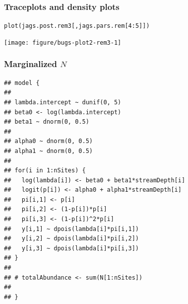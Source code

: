 \documentclass[color=usenames,dvipsnames]{beamer}\usepackage[]{graphicx}\usepackage[]{color}
\makeatletter
\newcommand{\hlnum}[1]{\textcolor[rgb]{0.69,0.494,0}{#1}}%
\newcommand{\hlopt}[1]{\textcolor[rgb]{0,0,0}{#1}}%
\newcommand{\hlstd}[1]{\textcolor[rgb]{0,0,0}{#1}}%
\newcommand{\hlkwd}[1]{\textcolor[rgb]{0.004,0.004,0.506}{#1}}%
\newenvironment{kframe}{%
 \def\at@end@of@kframe{}%
 \ifinner\ifhmode%
  \def\at@end@of@kframe{\end{minipage}}%
  \begin{minipage}{\columnwidth}%
 \fi\fi%
 \def\FrameCommand##1{\hskip\@totalleftmargin \hskip-\fboxsep
 \colorbox{shadecolor}{##1}\hskip-\fboxsep
     \hskip-\linewidth \hskip-\@totalleftmargin \hskip\columnwidth}%
 \MakeFramed {\advance\hsize-\width
   \@totalleftmargin\z@ \linewidth\hsize
   \@setminipage}}%
 {\par\unskip\endMakeFramed%
 \at@end@of@kframe}
\newenvironment{knitrout}{}{} %
\makeatother
\begin{document}
\begin{frame}[fragile]
  \frametitle{Traceplots and density plots}
\begin{knitrout}\footnotesize
{}\color{fgcolor}\begin{kframe}
\begin{alltt}
\hlkwd{plot}\hlstd{(jags.post.rem3[,jags.pars.rem[}\hlnum{4}\hlopt{:}\hlnum{5}\hlstd{]])}
\end{alltt}
\end{kframe}

{\centering \texttt{[image: figure/bugs-plot2-rem3-1]} 

}



\end{knitrout}
\end{frame}







\begin{frame}[fragile]
  \frametitle{Marginalized $N$}
\begin{knitrout}\scriptsize
{}\color{fgcolor}\begin{kframe}
\begin{verbatim}
## model {
## 
## lambda.intercept ~ dunif(0, 5)
## beta0 <- log(lambda.intercept)
## beta1 ~ dnorm(0, 0.5)
## 
## alpha0 ~ dnorm(0, 0.5)  
## alpha1 ~ dnorm(0, 0.5)
## 
## for(i in 1:nSites) {
##   log(lambda[i]) <- beta0 + beta1*streamDepth[i]
##   logit(p[i]) <- alpha0 + alpha1*streamDepth[i]
##   pi[i,1] <- p[i]
##   pi[i,2] <- (1-p[i])*p[i]
##   pi[i,3] <- (1-p[i])^2*p[i]
##   y[i,1] ~ dpois(lambda[i]*pi[i,1])
##   y[i,2] ~ dpois(lambda[i]*pi[i,2])
##   y[i,3] ~ dpois(lambda[i]*pi[i,3])
## }
## 
## # totalAbundance <- sum(N[1:nSites])
## 
## }
\end{verbatim}
\end{kframe}
\end{knitrout}
\end{frame}
\end{document}
